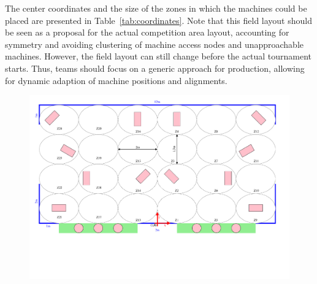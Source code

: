 \documentclass[12pt,twoside]{article}
\begin{document}
The center coordinates and the size of the zones in which the machines could
be placed are presented in Table~\ref{tab:coordinates}. Note
that this field layout should be seen as a proposal for the actual
competition area layout, accounting for symmetry and avoiding
clustering of machine access nodes and unapproachable
machines. However, the field layout can still change before the actual
tournament starts. Thus, teams should focus on a generic approach for
production, allowing for dynamic adaption of machine positions and
alignments.



\begin{figure}
  \includegraphics[keepaspectratio, angle=90, origin=c, scale=0.9]{field.pdf}
   \label{fig:puck}
\end{figure}
\end{document}
